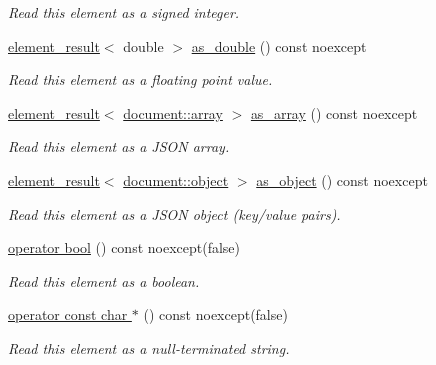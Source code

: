 \begin{DoxyCompactItemize}
\begin{DoxyCompactList}\small\item\em Read this element as a signed integer. \end{DoxyCompactList}\item 
\hyperlink{classsimdjson_1_1document_1_1element__result}{element\+\_\+result}$<$ double $>$ \hyperlink{classsimdjson_1_1document_1_1element_a1d6014890ca8f9fddbd97ab8c81a711c}{as\+\_\+double} () const noexcept
\begin{DoxyCompactList}\small\item\em Read this element as a floating point value. \end{DoxyCompactList}\item 
\hyperlink{classsimdjson_1_1document_1_1element__result}{element\+\_\+result}$<$ \hyperlink{classsimdjson_1_1document_1_1array}{document\+::array} $>$ \hyperlink{classsimdjson_1_1document_1_1element_afbd5b1b6a674a2e38ba5267c6999579c}{as\+\_\+array} () const noexcept
\begin{DoxyCompactList}\small\item\em Read this element as a J\+S\+ON array. \end{DoxyCompactList}\item 
\hyperlink{classsimdjson_1_1document_1_1element__result}{element\+\_\+result}$<$ \hyperlink{classsimdjson_1_1document_1_1object}{document\+::object} $>$ \hyperlink{classsimdjson_1_1document_1_1element_a1fe44151506bca67f318f9f4aeb02fc6}{as\+\_\+object} () const noexcept
\begin{DoxyCompactList}\small\item\em Read this element as a J\+S\+ON object (key/value pairs). \end{DoxyCompactList}\item 
\hyperlink{classsimdjson_1_1document_1_1element_a1157c9af47ff2049e8f9fd1e19003596}{operator bool} () const noexcept(false)
\begin{DoxyCompactList}\small\item\em Read this element as a boolean. \end{DoxyCompactList}\item 
\hyperlink{classsimdjson_1_1document_1_1element_a3c96e921fdff1894188d714446847857}{operator const char $\ast$} () const noexcept(false)
\begin{DoxyCompactList}\small\item\em Read this element as a null-\/terminated string. \end{DoxyCompactList}\item 

\end{DoxyCompactItemize}
